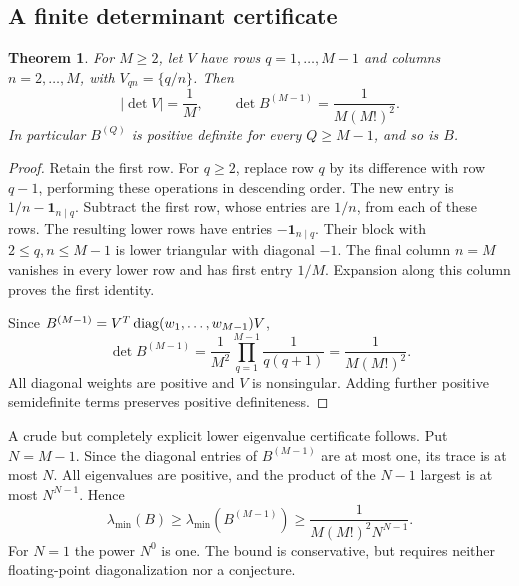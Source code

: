 \documentclass[11pt]{amsart}
\newtheorem{theorem}{Theorem}[section]
\theoremstyle{definition}
\begin{document}
\subsection{A finite determinant certificate}
\begin{theorem}\label{thm:reciprocaldet}
For $M\ge2$, let $V$ have rows $q=1,\ldots,M-1$ and columns
$n=2,\ldots,M$, with $V_{qn}=\{q/n\}$. Then
\[
 |\det V|=\frac1M,\qquad
 \det B^{(M-1)}=\frac1{M(M!)^2}.
\]
In particular $B^{(Q)}$ is positive definite for every $Q\ge M-1$,
and so is $B$.
\end{theorem}
\begin{proof}
Retain the first row. For $q\ge2$, replace row $q$ by its difference
with row $q-1$, performing these operations in descending order.
The new entry is $1/n-\boldsymbol1_{n\mid q}$. Subtract the first
row, whose entries are $1/n$, from each of these rows. The resulting
lower rows have entries $-\boldsymbol1_{n\mid q}$. Their block with
$2\le q,n\le M-1$ is lower triangular with diagonal $-1$.
The final column $n=M$ vanishes in every lower row and has first
entry $1/M$. Expansion along this column proves the first identity.

Since $B^{(M-1)}=V^T\operatorname{diag}(w_1,\ldots,w_{M-1})V$,
\[
 \det B^{(M-1)}=\frac1{M^2}\prod_{q=1}^{M-1}\frac1{q(q+1)}
   =\frac1{M(M!)^2}.
\]
All diagonal weights are positive and $V$ is nonsingular. Adding
further positive semidefinite terms preserves positive definiteness.
\end{proof}

A crude but completely explicit lower eigenvalue certificate follows.
Put $N=M-1$. Since the diagonal entries of $B^{(M-1)}$ are at most
one, its trace is at most $N$. All eigenvalues are positive, and
the product of the $N-1$ largest is at most $N^{N-1}$. Hence
\begin{equation}\label{eq:lambda}
 \lambda_{\min}(B)\ge\lambda_{\min}(B^{(M-1)})
 \ge\frac1{M(M!)^2N^{N-1}}.
\end{equation}
For $N=1$ the power $N^0$ is one. The bound is conservative, but
requires neither floating-point diagonalization nor a conjecture.
\end{document}
